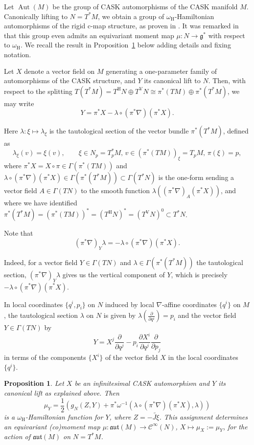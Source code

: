 \documentclass{article}
\newtheorem{proposition}[theorem]{Proposition}
\theoremstyle{definition}
\DeclareMathOperator{\Aut}{Aut}
\newcommand{\calC}{\mathcal{C}}
\newcommand{\frg}{\mathfrak{g}}
\newcommand{\hor}{\mathrm{H}}
\newcommand{\ver}{\mathrm{V}}
\newcommand{\aut}{\mathfrak{aut}}
\newcommand{\pd}[2]{\frac{\partial #1}{\partial #2}}
\begin{document}
    Let $\Aut(M)$ be the group of CASK automorphisms of the CASK manifold $M$. Canonically lifting to $N=T^*M$, we obtain a group of $\omega_\hor$-Hamiltonian automorphisms of the rigid c-map structure, as proven in \cite{CST21}. It was remarked in \cite[Proposition~2.10]{CRT21} that this group even admits an equivariant moment map $\mu:N\longrightarrow\frg^*$ with respect to $\omega_\hor$. We recall the result in Proposition~\ref{prop:moment_map} below adding details and fixing notation.\medskip
	
	Let $X$ denote a vector field on $M$ generating a one-parameter family of automorphisms of the CASK structure, and $Y$ its canonical lift to $N$. Then, with respect to the splitting $T(T^*M)=T^\hor N\oplus T^\ver N\cong\pi^*(TM)\oplus\pi^*(T^*M)$, we may write $$Y=\pi^*X-\lambda\circ(\pi^*\nabla)(\pi^*X).$$
	
	Here $\lambda:\xi\longmapsto\lambda_\xi$ is the tautological section of the vector bundle $\pi^*(T^*M)$, defined as $$\lambda_\xi(v)=\xi(v),\qquad\xi\in N_p=T_p^*M,\,v\in(\pi^*(TM))_\xi=T_pM,\,\pi(\xi)=p,$$ where $\pi^*X=X\circ\pi\in\Gamma(\pi^*(TM))$ and $\lambda\circ(\pi^*\nabla)(\pi^*X)\in\Gamma(\pi^*(T^*M))\subset\Gamma (T^*N)$ is the one-form sending a vector field $A\in\Gamma(TN)$ to the smooth function $\lambda((\pi^*\nabla)_A(\pi^*X))$, and where we have identified $\pi^*(T^*M)=(\pi^*(TM))^*=(T^\hor N)^*=(T^\ver N)^0\subset T^*N$.\medskip
	
	Note that \begin{equation}\label{pi*nabla:eq}
		(\pi^*\nabla)_Y\lambda=-\lambda\circ(\pi^*\nabla)(\pi^*X).
	\end{equation}

	Indeed, for a vector field $Y\in\Gamma(TN)$ and $\lambda\in\Gamma(\pi^*(T^*M))$ the tautological section, $(\pi^*\nabla)_Y\lambda$ gives us the vertical component of $Y$, which is precisely $-\lambda\circ(\pi^*\nabla)(\pi^*X)$.\medskip
	
	In local coordinates $\{q^i,p_i\}$ on $N$ induced by local $\nabla$-affine coordinates $\{q^i\}$ on $M$, the tautological section $\lambda$ on $N$ is given by $\lambda(\pd{}{q^i})=p_i$ and the vector field $Y\in\Gamma(TN)$ by $$Y=X^j\pd{}{q^j}-p_i\pd{X^i}{q^j}\pd{}{p_j}$$ in terms of the components $\{X^i\}$ of the vector field $X$ in the local coordinates $\{q^i\}$.
	
	\begin{proposition}\label{prop:moment_map}
		Let $X$ be an infinitesimal CASK automorphism and $Y$ its canonical lift as explained above. Then $$\mu_Y=\frac{1}{2}\left(g_N(Z,Y)+\pi^*\omega^{-1}(\lambda\circ(\pi^*\nabla)(\pi^*X),\lambda)\right)$$ is a $\omega_\hor$-Hamiltonian function for $Y$, where $Z=-\widetilde{J\xi}$. This assignment determines an equivariant (co)moment map $\mu:\aut(M)\longrightarrow\calC^\infty(N)$, $X\longmapsto\mu_X:=\mu_Y$, for the action of $\aut(M)$ on $N=T^*M$.
	\end{proposition}
\end{document}
